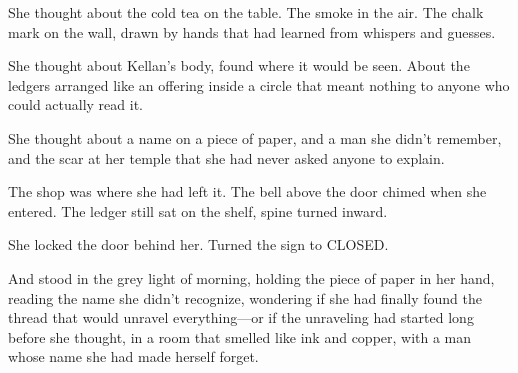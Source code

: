 \documentclass[12pt,letterpaper,openany]{book}
\begin{document}
\par
She thought about the cold tea on the table. The smoke in the air. The chalk mark on the wall, drawn by hands that had learned from whispers and guesses.
\par
She thought about Kellan's body, found where it would be seen. About the ledgers arranged like an offering inside a circle that meant nothing to anyone who could actually read it.
\par
She thought about a name on a piece of paper, and a man she didn't remember, and the scar at her temple that she had never asked anyone to explain.
\par
The shop was where she had left it. The bell above the door chimed when she entered. The ledger still sat on the shelf, spine turned inward.
\par
She locked the door behind her. Turned the sign to CLOSED.
\par
And stood in the grey light of morning, holding the piece of paper in her hand, reading the name she didn't recognize, wondering if she had finally found the thread that would unravel everything—or if the unraveling had started long before she thought, in a room that smelled like ink and copper, with a man whose name she had made herself forget.
\par
\end{document}
